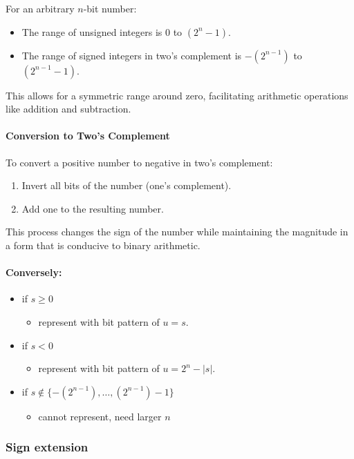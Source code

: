 \documentclass[12pt]{article}
\begin{document}
For an arbitrary \( n \)-bit number:
\begin{itemize}
    \item The range of unsigned integers is \( 0 \) to \( (2^n - 1) \).
    \item The range of signed integers in two's complement is \( -(2^{n-1}) \) to \( (2^{n-1} - 1) \).
\end{itemize}
This allows for a symmetric range around zero, facilitating arithmetic operations like addition and subtraction.


\paragraph{Conversion to Two's Complement}
To convert a positive number to negative in two's complement:
\begin{enumerate}
    \item Invert all bits of the number (one's complement).
    \item Add one to the resulting number.
\end{enumerate}
This process changes the sign of the number while maintaining the magnitude in a form that is conducive to binary arithmetic.


\paragraph{Conversely:}

\begin{itemize}
    \item if $s \geq 0$
    \begin{itemize}
        \item represent with bit pattern of $u = s$.
    \end{itemize}
    \item if $s < 0$
    \begin{itemize}
        \item represent with bit pattern of $u = 2^n - |s|$.
    \end{itemize}
    \item if $s \notin \{-(2^{n-1}), \ldots, (2^{n-1}) - 1\}$
    \begin{itemize}
        \item cannot represent, need larger $n$
    \end{itemize}
\end{itemize}

\subsubsection{Sign extension}
\end{document}
